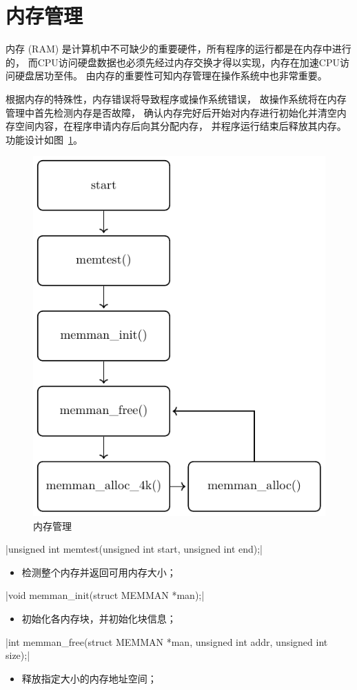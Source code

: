 \section{内存管理}

内存 (RAM) 是计算机中不可缺少的重要硬件，所有程序的运行都是在内存中进行的，
而CPU访问硬盘数据也必须先经过内存交换才得以实现，内存在加速CPU访问硬盘居功至伟。
由内存的重要性可知内存管理在操作系统中也非常重要。	

根据内存的特殊性，内存错误将导致程序或操作系统错误，
故操作系统将在内存管理中首先检测内存是否故障，
确认内存完好后开始对内存进行初始化并清空内存空间内容，在程序申请内存后向其分配内存，
并程序运行结束后释放其内存。功能设计如图~\ref{fig:memman}。
\begin{figure}[H]
  \centering
  \includegraphics[width=.5\textwidth]{fig/func/memman.pdf}
  \caption{内存管理}
  \label{fig:memman}
\end{figure}

\csingle|unsigned int memtest(unsigned int start, unsigned int end);|
\begin{itemize}
  \item 检测整个内存并返回可用内存大小；
\end{itemize}

\csingle|void memman_init(struct MEMMAN *man);|
\begin{itemize}
  \item 初始化各内存块，并初始化块信息；
\end{itemize}

\csingle|int memman_free(struct MEMMAN *man, unsigned int addr, unsigned int size);|
\begin{itemize}
  \item 释放指定大小的内存地址空间；
\end{itemize}

